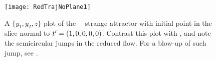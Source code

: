  \begin{figure}
 \texttt{[image: RedTrajNoPlane1]}%
 \caption{\label{fig:RedTrajNoPlane1}
A $\{y_1,y_2,z\}$ plot of the \reducedsp\ \cLf\ strange attractor
with initial point
in the
slice normal to $t'_{}=(1,0,0,0,0)$. Contrast this plot with
, and note the semicircular jumps in the
reduced flow. For a blow-up of such jump, see .
 }%
 \end{figure}

%
